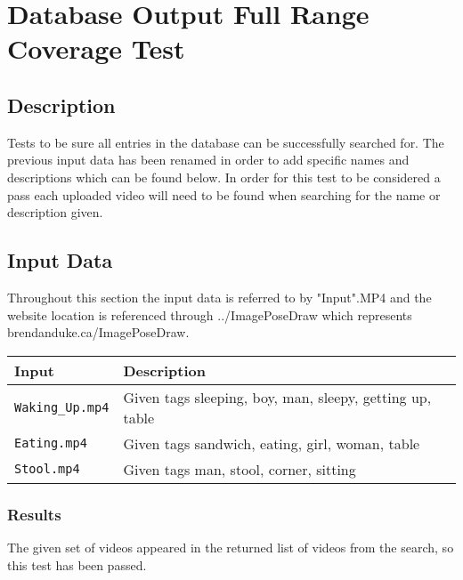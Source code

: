 \documentclass{scrreprt}
\begin{document}
\section{Database Output Full Range Coverage Test}
\subsection{Description}

Tests to be sure all entries in the database can be successfully searched for. The previous input data has been renamed in order to add specific names and descriptions which can be found below. In order for this test to be considered a pass each uploaded video will need to be found when searching for the name or description given.

\subsection{Input Data}

Throughout this section the input data is referred to by "Input".MP4 and the website location is referenced through ../ImagePoseDraw which represents brendanduke.ca/ImagePoseDraw.

\begin{table}[H]
        \centering
        \begin{tabular}{p{3cm}p{6cm}}
                \hline\hline
                Input & Description\\
                \hline\hline
                \verb|Waking_Up.mp4| &  Given tags sleeping, boy, man, sleepy, getting up, table\\
                \hline
                \verb|Eating.mp4| &  Given tags sandwich, eating, girl, woman, table\\
                \hline
                \verb|Stool.mp4| &  Given tags man, stool, corner, sitting\\
                \hline
        \end{tabular}
\end{table}

\subsubsection{Results}

The given set of videos appeared in the returned list of videos from the search, so this test has been passed.
\end{document}
